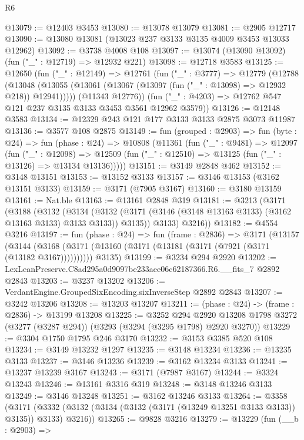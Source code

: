 \begin{lexlean}{R6}
\begin{coremodule}
@13079 := @12403 @3453
@13080 := @13078 @13079
@13081 := @2905 @12717
@13090 := @13080 @13081 (@13023 @237 @3133 @3135 @4009 @3453 @13033 @12962)
@13092 := @3738 @4008 @108
@13097 := @13074 (@13090 @13092) (fun ("_" : @12719) => @12932 @221)
@13098 := @12718 @3583
@13125 := @12650
    (fun ("_" : @12149) =>
    @12761
      (fun ("_" : @3777) =>
      @12779
        (@12788
          (@13048 (@13055 (@13061 (@13067 (@13097 (fun ("_" : @13098) => @12932 @218)) @12941)))))
        (@11343 @12776))
      (fun ("_" : @4203) => @12762 @547 @121 @237 @3135 @3133 @3453 @3561 @12962 @3579))
@13126 := @12148 @3583
@13134 := @12329 @243 @121 @177 @3133 @3133 @2875 @3073 @11987
@13136 := @3577 @108 @2875
@13149 := fun (grouped : @2903) =>
  fun (byte : @24) =>
  fun (phase : @24) =>
  @10808
    (@11361
      (fun ("_" : @9481) =>
      @12097
        (fun ("_" : @12098) =>
        @12509 (fun ("_" : @12510) => @13125 (fun ("_" : @13126) => @13134 @13136)))))
@13151 := @3149 @2848 @462
@13152 := @3148 @13151
@13153 := @13152 @3133
@13157 := @3146 @13153 (@3162 @13151 @3133)
@13159 := @3171 (@7905 @3167)
@13160 := @3180 @13159
@13161 := Nat.ble
@13163 := @13161 @2848 @319
@13181 := @3213
    (@3171
      (@3188
        (@3132
          (@3134
            (@3132 (@3171 (@3146 (@3148 @13163 @3133) (@3162 @13163 @3133) @3133 @3133)) @3135))
          @3133)
        @3216))
@13182 := @4554 @3216
@13197 := fun (phase : @24) =>
  fun (frame : @2836) =>
  @3171
    (@13157
      (@3144 (@3168 (@3171 (@13160 (@3171 (@13181 (@3171 (@7921 (@3171 (@13182 @3167))))))))))
      @3135)
@13199 := @3234 @294 @2920
@13202 := LexLeanPreserve.C8ad295a0d9097be233aee06c62187366.R6.__fits_7 @2892 @2843
@13203 := @3237 @13202
@13206 := VerdantEngine.GroupedSixEncoding.sixInverseStep @2892 @2843
@13207 := @3242 @13206
@13208 := @13203 @13207
@13211 := (phase : @24) -> (frame : @2836) -> @13199 @13208
@13225 := @3252
    @294
    @2920
    @13208
    @1798
    @3272
    (@3277 (@3287 @294))
    (@3293 (@3294 (@3295 @1798) @2920 @3270))
@13229 := @3304 @1750 @1795 @246 @3170
@13232 := @3153 @3385 @520 @108
@13234 := @3149 @13232 @1297
@13235 := @3148 @13234
@13236 := @13235 @3133
@13237 := @3146 @13236
@13239 := @3162 @13234 @3133
@13241 := @13237 @13239 @3167
@13243 := @3171 (@7987 @3167)
@13244 := @3324 @13243
@13246 := @13161 @3316 @319
@13248 := @3148 @13246 @3133
@13249 := @3146 @13248
@13251 := @3162 @13246 @3133
@13264 := @3358
    (@3171 (@3332 (@3132 (@3134 (@3132 (@3171 (@13249 @13251 @3133 @3133)) @3135)) @3133) @3216))
@13265 := @9828 @3216
@13279 := @13229
    (fun (__b : @2903) =>

\end{coremodule}
\end{lexlean}
